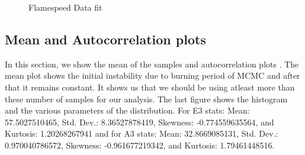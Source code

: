  \begin{figure}[H]
  \ContinuedFloat
  \caption{Flamespeed Data fit}
\end{figure}



\subsection{Mean and Autocorrelation plots}

In this section, we show the mean of the samples and autocorrelation plots . The mean plot shows the initial instability due to burning period of MCMC and after that it remains constant. It shows us that we should be using atleast more than these number of samples for our analysis. The last figure shows the histogram and the various parameters of the distribution. For E3 stats: Mean:  57.5027510465, Std. Dev.:  8.36527878419, Skewness:  -0.774559635564, and Kurtosis:  1.20268267941 and for A3 stats: Mean:  32.8669085131, Std. Dev.:  0.970040786572, Skewness:  -0.961677219342, and Kurtosis:  1.79461448516.

